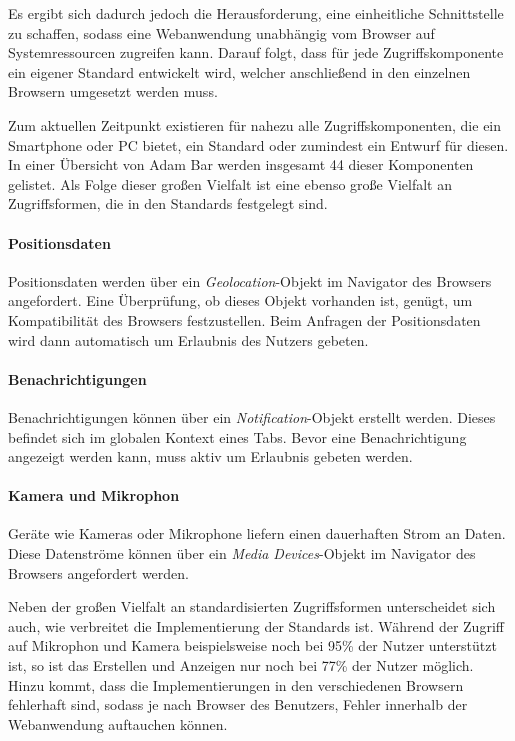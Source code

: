 \documentclass[12pt, parskip=half]{scrartcl}       %
\begin{document}
Es ergibt sich dadurch jedoch die Herausforderung, eine einheitliche Schnittstelle zu schaffen, sodass eine Webanwendung unabhängig vom Browser auf Systemressourcen zugreifen kann.
Darauf folgt, dass für jede Zugriffskomponente ein eigener Standard entwickelt wird, welcher anschließend in den einzelnen Browsern umgesetzt werden muss.

Zum aktuellen Zeitpunkt existieren für nahezu alle Zugriffskomponenten, die ein Smartphone oder PC bietet, ein Standard oder zumindest ein Entwurf für diesen.
In einer Übersicht von Adam Bar\cite{bar_webcando} werden insgesamt 44 dieser Komponenten gelistet.
Als Folge dieser großen Vielfalt ist eine ebenso große Vielfalt an Zugriffsformen, die in den Standards festgelegt sind.

\paragraph{Positionsdaten} Positionsdaten werden über ein \textit{Geolocation}-Objekt im Navigator des Browsers angefordert.
Eine Überprüfung, ob dieses Objekt vorhanden ist, genügt, um Kompatibilität des Browsers festzustellen.
Beim Anfragen der Positionsdaten wird dann automatisch um Erlaubnis des Nutzers gebeten\cite{w3c_geolocation}.

\paragraph{Benachrichtigungen} Benachrichtigungen können über ein \textit{Notification}-Objekt erstellt werden. Dieses befindet sich im globalen Kontext eines Tabs.
Bevor eine Benachrichtigung angezeigt werden kann, muss aktiv um Erlaubnis gebeten werden\cite{whatwg_notification}.

\paragraph{Kamera und Mikrophon} Geräte wie Kameras oder Mikrophone liefern einen dauerhaften Strom an Daten.
Diese Datenströme können über ein \textit{Media Devices}-Objekt im Navigator des Browsers angefordert werden\cite{w3c_mediacapture}.

Neben der großen Vielfalt an standardisierten Zugriffsformen unterscheidet sich auch, wie verbreitet die Implementierung der Standards ist.
Während der Zugriff auf Mikrophon und Kamera beispielsweise noch bei 95\% der Nutzer unterstützt ist, so ist das Erstellen und Anzeigen nur noch bei 77\% der Nutzer möglich\cite{caniuse}.
Hinzu kommt, dass die Implementierungen in den verschiedenen Browsern fehlerhaft sind, sodass je nach Browser des Benutzers, Fehler innerhalb der Webanwendung auftauchen können.
\end{document}
